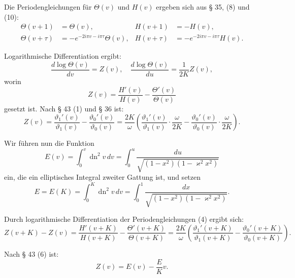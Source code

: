 \documentclass[12pt,a4paper]{article}
\theoremstyle{definition}
\begin{document}
Die Periodengleichungen f\"{u}r $\Theta(v)$ und $H(v)$ ergeben sich
aus \S{} 35, (8) und (10):
\begin{equation}\tag{4}
\begin{aligned}
\Theta(v + 1) &= \Theta(v), & H(v + 1) &= -H(v),\\
\Theta(v + \tau) &= -e^{-2i\pi v - i\pi\tau}\Theta(v), &
H(v + \tau) &= -e^{-2i\pi v - i\pi\tau}H(v).
\end{aligned}
\end{equation}

Logarithmische Differentiation ergibt:
\begin{equation}\tag{5}
\frac{d\log\Theta(v)}{dv} = Z(v), \quad
\frac{d\log\Theta(v)}{du} = \frac{1}{2K}Z(v),
\end{equation}
worin
\begin{equation}\tag{6}
Z(v) = \frac{H'(v)}{H(v)} - \frac{\Theta'(v)}{\Theta(v)}
\end{equation}
gesetzt ist. Nach \S{} 43 (1) und \S{} 36 ist:
\begin{equation}\tag{7}
Z(v) = \frac{\vartheta_1'(v)}{\vartheta_1(v)} - \frac{\vartheta_0'(v)}{\vartheta_0(v)}
= \frac{2K}{\omega}\left(\frac{\vartheta_1'(v)}{\vartheta_1(v)} \cdot \frac{\omega}{2K} - \frac{\vartheta_0'(v)}{\vartheta_0(v)} \cdot \frac{\omega}{2K}\right).
\end{equation}

Wir f\"{u}hren nun die Funktion
\begin{equation}\tag{8}
E(v) = \int_0^v \operatorname{dn}^2 v \, dv = \int_0^u \frac{du}{\sqrt{(1 - x^2)(1 - \varkappa^2x^2)}}
\end{equation}
ein, die ein elliptisches Integral zweiter Gattung ist, und setzen
\begin{equation}\tag{9}
E = E(K) = \int_0^K \operatorname{dn}^2 v \, dv = \int_0^1 \frac{dx}{\sqrt{(1 - x^2)(1 - \varkappa^2x^2)}}.
\end{equation}

Durch logarithmische Differentiation der Periodengleichungen
(4) ergibt sich:
\begin{equation}\tag{10}
Z(v + K) - Z(v) = \frac{H'(v + K)}{H(v + K)} - \frac{\Theta'(v + K)}{\Theta(v + K)}
= \frac{2K}{\omega}\left(\frac{\vartheta_1'(v + K)}{\vartheta_1(v + K)} - \frac{\vartheta_0'(v + K)}{\vartheta_0(v + K)}\right).
\end{equation}

Nach \S{} 43 (6) ist:
\begin{equation}\tag{11}
Z(v) = E(v) - \frac{E}{K}v.
\end{equation}
\end{document}
